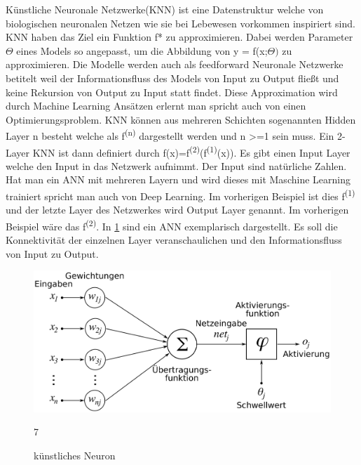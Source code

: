 \documentclass{llncs}
\begin{document}
Künstliche Neuronale Netzwerke(KNN) ist eine Datenstruktur welche von biologischen neuronalen Netzen wie sie bei Lebewesen vorkommen inspiriert sind. KNN haben das Ziel ein Funktion f* zu approximieren. Dabei werden Parameter $\Theta$ eines Models so angepasst, um die Abbildung von y = f(x;$\Theta)$ zu approximieren. Die Modelle werden auch als feedforward Neuronale Netzwerke betitelt weil der Informationsfluss des Models von Input zu Output fließt und keine Rekursion von Output zu Input statt findet. Diese Approximation wird durch Machine Learning Ansätzen erlernt man spricht auch von einen Optimierungsproblem. KNN können aus mehreren Schichten sogenannten Hidden Layer n besteht welche als f\textsuperscript{(n)} dargestellt werden und n >=1 sein muss. Ein 2-Layer KNN ist dann definiert durch f(x)=f\textsuperscript{(2)}(f\textsuperscript{(1)}(x)). Es gibt einen Input Layer welche den Input in das Netzwerk aufnimmt. Der Input sind natürliche Zahlen. Hat man ein ANN mit mehreren Layern und wird dieses mit Maschine Learning trainiert spricht man auch von Deep Learning. Im vorherigen Beispiel ist dies f\textsuperscript{(1)} und der letzte Layer des Netzwerkes wird Output Layer genannt. Im vorherigen Beispiel wäre das f\textsuperscript{(2)}\cite{Grundlagen}. In \ref{fig:Bild1} sind ein ANN exemplarisch dargestellt. Es soll die Konnektivität der einzelnen Layer veranschaulichen und den Informationsfluss von Input zu Output. 

\begin{figure}[htbp]
	\centering
	\includegraphics[width=1.0\textwidth]{Neuron.png}
	\caption{künstliches Neuron}7
	\label{fig:Bild1}
\end{figure}
\end{document}
